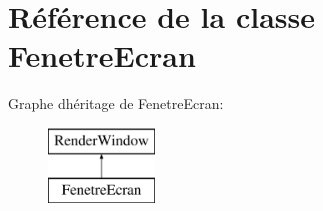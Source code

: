 \hypertarget{class_fenetre_ecran}{}\section{Référence de la classe Fenetre\+Ecran}
\label{class_fenetre_ecran}
Graphe d\textquotesingle{}héritage de Fenetre\+Ecran\+:\begin{figure}[H]
\begin{center}
\leavevmode
\includegraphics[height=2.000000cm]{class_fenetre_ecran}
\end{center}
\end{figure}
